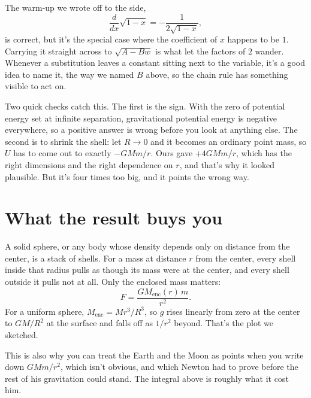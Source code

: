 \documentclass[11pt]{article}
\begin{document}
The warm-up we wrote off to the side,
\[
\frac{d}{dx}\sqrt{1-x} = -\frac{1}{2\sqrt{1-x}},
\]
is correct, but it's the special case where the coefficient of $x$ happens to be $1$.
Carrying it straight across to $\sqrt{A - Bw}$ is what let the factors of $2$ wander.
Whenever a substitution leaves a constant sitting next to the variable, it's a good idea
to name it, the way we named $B$ above, so the chain rule has something visible to act on.

Two quick checks catch this. The first is the sign. With the zero of potential energy set
at infinite separation, gravitational potential energy is negative everywhere, so a
positive answer is wrong before you look at anything else. The second is to shrink the
shell: let $R \to 0$ and it becomes an ordinary point mass, so $U$ has to come out to
exactly $-GMm/r$. Ours gave $+4GMm/r$, which has the right dimensions and the right
dependence on $r$, and that's why it looked plausible. But it's four times too big, and it
points the wrong way.

\section*{What the result buys you}

A solid sphere, or any body whose density depends only on distance from the center, is a
stack of shells. For a mass at distance $r$ from the center, every shell inside that
radius pulls as though its mass were at the center, and every shell outside it pulls not
at all. Only the enclosed mass matters:
\[
F = \frac{G M_{\text{enc}}(r)\,m}{r^2} .
\]
For a uniform sphere, $M_{\text{enc}} = M r^3/R^3$, so $g$ rises linearly from zero at the
center to $GM/R^2$ at the surface and falls off as $1/r^2$ beyond. That's the plot we
sketched.

This is also why you can treat the Earth and the Moon as points when you write down
$GMm/r^2$, which isn't obvious, and which Newton had to prove before the rest of his
gravitation could stand. The integral above is roughly what it cost him.
\end{document}
